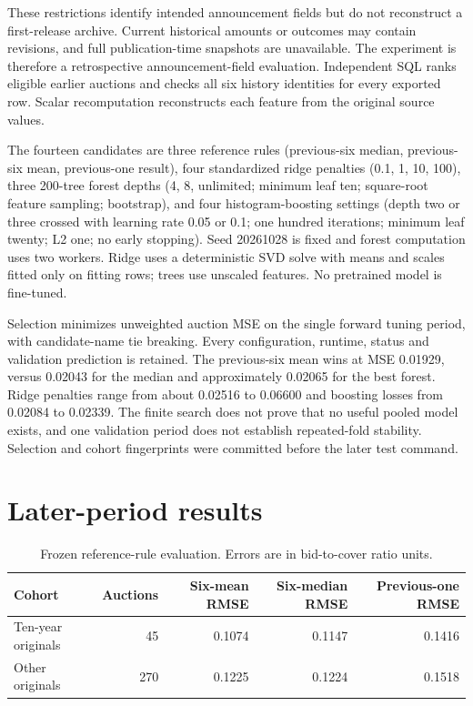 \documentclass[11pt]{article}
\begin{document}
These restrictions identify intended announcement fields but do not reconstruct a first-release archive. Current historical amounts or outcomes may contain revisions, and full publication-time snapshots are unavailable. The experiment is therefore a retrospective announcement-field evaluation. Independent SQL ranks eligible earlier auctions and checks all six history identities for every exported row. Scalar recomputation reconstructs each feature from the original source values.

The fourteen candidates are three reference rules (previous-six median, previous-six mean, previous-one result), four standardized ridge penalties (0.1, 1, 10, 100), three 200-tree forest depths (4, 8, unlimited; minimum leaf ten; square-root feature sampling; bootstrap), and four histogram-boosting settings (depth two or three crossed with learning rate 0.05 or 0.1; one hundred iterations; minimum leaf twenty; L2 one; no early stopping). Seed 20261028 is fixed and forest computation uses two workers. Ridge uses a deterministic SVD solve with means and scales fitted only on fitting rows; trees use unscaled features. No pretrained model is fine-tuned.

Selection minimizes unweighted auction MSE on the single forward tuning period, with candidate-name tie breaking. Every configuration, runtime, status and validation prediction is retained. The previous-six mean wins at MSE 0.01929, versus 0.02043 for the median and approximately 0.02065 for the best forest. Ridge penalties range from about 0.02516 to 0.06600 and boosting losses from 0.02084 to 0.02339. The finite search does not prove that no useful pooled model exists, and one validation period does not establish repeated-fold stability. Selection and cohort fingerprints were committed before the later test command.
\section{Later-period results}
\begin{table}[ht]\centering\small
\caption{Frozen reference-rule evaluation. Errors are in bid-to-cover ratio units.}
\begin{tabular}{lrrrr}\toprule
Cohort & Auctions & Six-mean RMSE & Six-median RMSE & Previous-one RMSE\\\midrule
Ten-year originals & 45 & 0.1074 & 0.1147 & 0.1416\\
Other originals & 270 & 0.1225 & 0.1224 & 0.1518\\\bottomrule
\end{tabular}\end{table}
\end{document}
